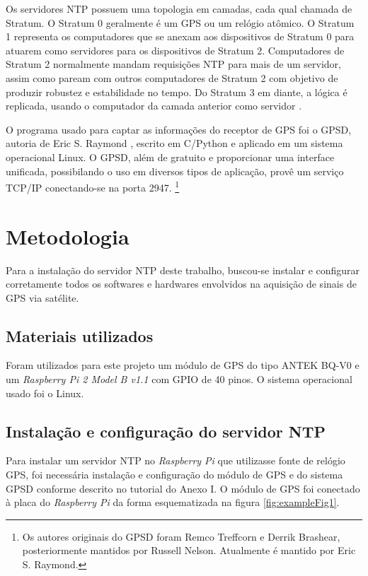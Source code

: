 \documentclass[12pt]{article}
\begin{document}
Os servidores NTP possuem uma topologia em camadas, cada qual chamada de Stratum. O Stratum 0  geralmente é um GPS ou um relógio atômico. O Stratum 1 representa os computadores que se anexam aos dispositivos de Stratum 0 para atuarem como servidores para os dispositivos de Stratum 2. Computadores de Stratum 2 normalmente mandam requisições NTP para mais de um servidor, assim como paream com outros computadores de Stratum 2 com objetivo de produzir robustez e estabilidade no tempo. Do Stratum 3 em diante, a lógica é replicada, usando o computador da camada anterior como servidor \cite{corcoran}. 

O programa usado para captar as informações do receptor de GPS foi o GPSD, autoria de Eric S. Raymond , escrito em C/Python e aplicado em um sistema operacional Linux.
O GPSD, além de gratuito e proporcionar uma interface unificada, possibilando o uso em diversos tipos de aplicação, provê um serviço TCP/IP conectando-se na porta 2947.
\footnote{
Os autores originais do GPSD foram Remco Treffcorn e Derrik Brashear, posteriormente mantidos por Russell Nelson. Atualmente é mantido por Eric S. Raymond.
}
\section{Metodologia} \label{sec:firstpage}

	Para a instalação do servidor NTP deste trabalho, buscou-se instalar e configurar corretamente todos os softwares e hardwares envolvidos na aquisição de sinais de GPS via satélite. 
    
\subsection{Materiais utilizados}

Foram utilizados para este projeto um módulo de GPS do tipo ANTEK BQ-V0 e um \textit{Raspberry Pi 2 Model B v1.1} com GPIO de 40 pinos. O sistema operacional usado foi o Linux.

\subsection{Instalação e configuração do servidor NTP}

Para instalar um servidor NTP no \textit{Raspberry Pi} que utilizasse fonte de relógio GPS, foi necessária instalação e configuração do módulo de GPS e do sistema GPSD conforme descrito no tutorial do Anexo I. O módulo de GPS foi conectado à placa do \textit{Raspberry Pi} da forma esquematizada na figura \ref{fig:exampleFig1}.   
\end{document}
